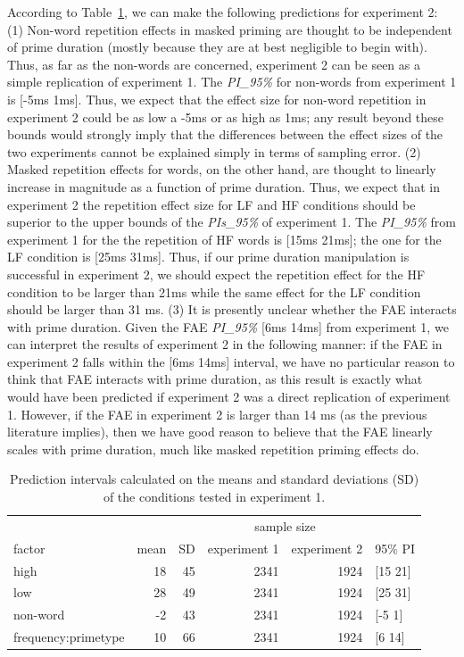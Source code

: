 \documentclass[
]{interact}
\begin{document}
According to Table~\ref{tbl-pis}, we can make the following predictions
for experiment 2: (1) Non-word repetition effects in masked priming are
thought to be independent of prime duration (mostly because they are at
best negligible to begin with). Thus, as far as the non-words are
concerned, experiment 2 can be seen as a simple replication of
experiment 1. The \emph{PI\_95\%} for non-words from experiment 1 is
{[}-5ms 1ms{]}. Thus, we expect that the effect size for non-word
repetition in experiment 2 could be as low a -5ms or as high as 1ms; any
result beyond these bounds would strongly imply that the differences
between the effect sizes of the two experiments cannot be explained
simply in terms of sampling error. (2) Masked repetition effects for
words, on the other hand, are thought to linearly increase in magnitude
as a function of prime duration. Thus, we expect that in experiment 2
the repetition effect size for LF and HF conditions should be superior
to the upper bounds of the \emph{PIs\_95\%} of experiment 1. The
\emph{PI\_95\%} from experiment 1 for the the repetition of HF words is
{[}15ms 21ms{]}; the one for the LF condition is {[}25ms 31ms{]}. Thus,
if our prime duration manipulation is successful in experiment 2, we
should expect the repetition effect for the HF condition to be larger
than 21ms while the same effect for the LF condition should be larger
than 31 ms. (3) It is presently unclear whether the FAE interacts with
prime duration. Given the FAE \emph{PI\_95\%} {[}6ms 14ms{]} from
experiment 1, we can interpret the results of experiment 2 in the
following manner: if the FAE in experiment 2 falls within the {[}6ms
14ms{]} interval, we have no particular reason to think that FAE
interacts with prime duration, as this result is exactly what would have
been predicted if experiment 2 was a direct replication of experiment 1.
However, if the FAE in experiment 2 is larger than 14 ms (as the
previous literature implies), then we have good reason to believe that
the FAE linearly scales with prime duration, much like masked repetition
priming effects do.

\begin{longtable}{lrrrrl}

\caption{\label{tbl-pis}Prediction intervals calculated on the means and
standard deviations (SD) of the conditions tested in experiment 1.}

\tabularnewline

\toprule
 &  &  & \multicolumn{2}{c}{sample size} &  \\ 
\cmidrule(lr){4-5}
factor & mean & SD & experiment 1 & experiment 2 & 95\% PI \\ 
\midrule\addlinespace[2.5pt]
high & 18 & 45 & 2341 & 1924 & [15 21] \\ 
low & 28 & 49 & 2341 & 1924 & [25 31] \\ 
non-word & -2 & 43 & 2341 & 1924 & [-5 1] \\ 
frequency:primetype & 10 & 66 & 2341 & 1924 & [6 14] \\ 
\bottomrule

\end{longtable}
\end{document}
